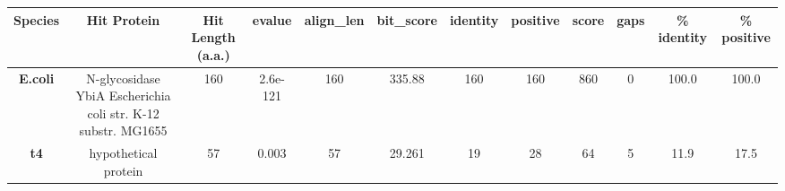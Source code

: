 \begin{tabular}{|c|c|c|c|c|c|c|c|c|c|c|c|} \hline
\textbf{Species} & \textbf{Hit Protein} & \textbf{Hit Length (a.a.)} & \textbf{evalue} & \textbf{align\_len} & \textbf{bit\_score} & \textbf{identity} & \textbf{positive} & \textbf{score} & \textbf{gaps} & \textbf{\% identity} & \textbf{\% positive} \\ \hline
\textbf{E.coli} & N-glycosidase YbiA Escherichia coli str. K-12 substr. MG1655 & 160 & 2.6e-121 & 160 & 335.88 & 160 & 160 & 860 & 0 & 100.0 & 100.0\\
\textbf{t4} & hypothetical protein  & 57 & 0.003 & 57 & 29.261 & 19 & 28 & 64 & 5 & 11.9 & 17.5\\
\hline \end{tabular}
